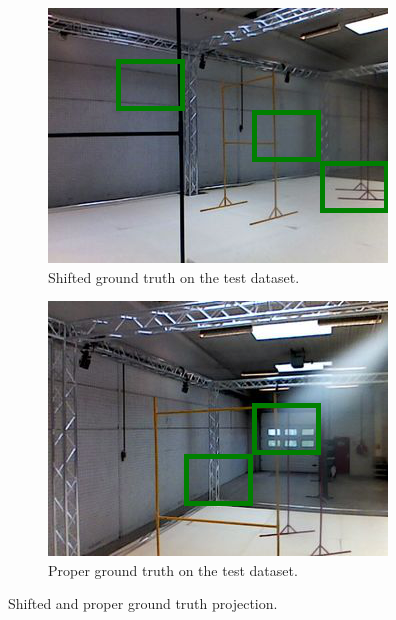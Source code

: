 \begin{figure}[h]
	\centering
	\begin{subfigure}{0.49\textwidth}
		\includegraphics[width=\textwidth]{figure/shifted_gt.png}
		\caption{Shifted ground truth on the test dataset.}
		\label{fig:bad-gt}
	\end{subfigure}
	\begin{subfigure}{0.49\textwidth}
		\includegraphics[width=\textwidth]{figure/good_gt.png}
		\caption{Proper ground truth on the test dataset.}
		\label{fig:good-gt}
	\end{subfigure}
	\caption[Shifted and proper ground truth projection]{Shifted and proper
	ground truth projection.}
\end{figure}

